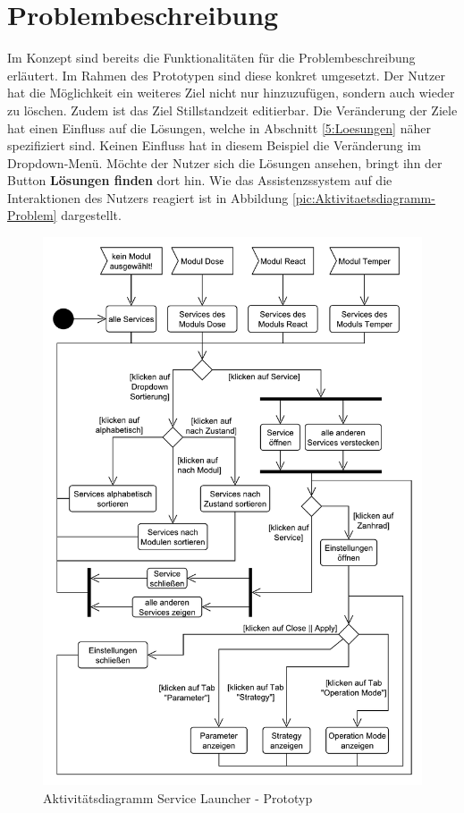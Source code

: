 \section{Problembeschreibung}
\label{5:Problembeschreibung}
Im Konzept sind bereits die Funktionalitäten für die Problembeschreibung erläutert. Im Rahmen des Prototypen sind diese konkret umgesetzt. Der Nutzer hat die Möglichkeit ein weiteres Ziel nicht nur hinzuzufügen, sondern auch wieder zu löschen. Zudem ist das Ziel Stillstandzeit editierbar. Die Veränderung der Ziele hat einen Einfluss auf die Lösungen, welche in Abschnitt \ref{5:Loesungen} näher spezifiziert sind. Keinen Einfluss hat in diesem Beispiel die Veränderung im Dropdown-Menü. Möchte der Nutzer sich die Lösungen ansehen, bringt ihn der Button \textbf{Lösungen finden} dort hin. Wie das Assistenzssystem auf die Interaktionen des Nutzers reagiert ist in Abbildung \ref{pic:Aktivitaetsdiagramm-Problem} dargestellt.

\begin{figure}[htbp]
\centering
\includegraphics[scale=0.65]{DA_files/UML/Prototyp/Aktivitaetsdiagramm-ServiceLauchner.pdf}
\caption{Aktivitätsdiagramm Service Launcher - Prototyp}
\label{pic:Aktivitaetsdiagramm-ServiceLauncher}
\end{figure}

